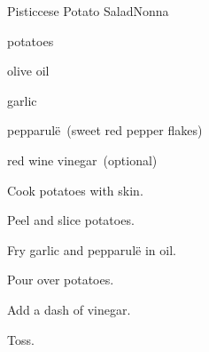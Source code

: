 \begin{recipe}{Pisticcese Potato Salad}{Nonna}{}

\begin{ingredients}
\item potatoes
\item olive oil
\item garlic
\item pepparul\"e~(sweet red pepper flakes)
\item red wine vinegar~(optional)
\end{ingredients}

\begin{directions}
\item Cook potatoes with skin.
\item Peel and slice potatoes.
\item Fry garlic and pepparul\"e in oil.
\item Pour over potatoes.
\item Add a dash of vinegar.
\item Toss.
\end{directions}

\end{recipe}
